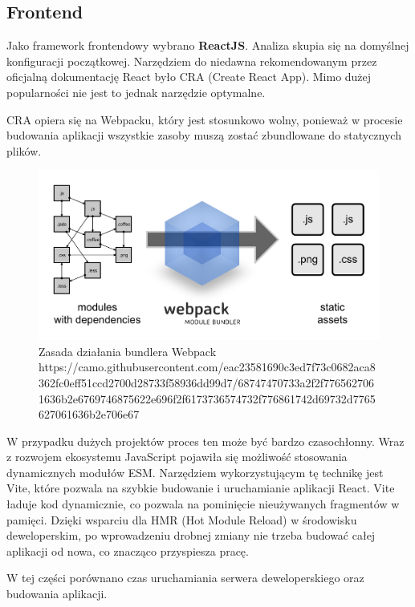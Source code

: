 \documentclass{article}
\begin{document}
\subsection{Frontend}

Jako framework frontendowy wybrano \textbf{ReactJS}. Analiza skupia się na domyślnej konfiguracji początkowej. Narzędziem do niedawna rekomendowanym przez oficjalną dokumentację React było CRA\cite{DevCra} (Create React App). Mimo dużej popularności nie jest to jednak narzędzie optymalne.

CRA opiera się na Webpacku, który jest stosunkowo wolny, ponieważ w procesie budowania aplikacji wszystkie zasoby muszą zostać zbundlowane do statycznych plików.

\begin{figure}[H]
    \centering
    \includegraphics[width=\textwidth]{webpack.png}
    \caption{Zasada działania bundlera Webpack https://camo.githubusercontent.com/eac23581690c3ed7f73c0682aca8362fc0eff51ccd2700d28733f58936dd99d7/68747470733a2f2f7765627061636b2e6769746875622e696f2f6173736574732f776861742d69732d7765627061636b2e706e67}
    \label{fig:ast}
\end{figure}

W przypadku dużych projektów proces ten może być bardzo czasochłonny. Wraz z rozwojem ekosystemu JavaScript pojawiła się możliwość stosowania dynamicznych modułów ESM. Narzędziem wykorzystującym tę technikę jest Vite, które pozwala na szybkie budowanie i uruchamianie aplikacji React\cite{ViteSite}. Vite ładuje kod dynamicznie, co pozwala na pominięcie nieużywanych fragmentów w pamięci. Dzięki wsparciu dla HMR (Hot Module Reload) w środowisku deweloperskim, po wprowadzeniu drobnej zmiany nie trzeba budować całej aplikacji od nowa, co znacząco przyspiesza pracę.

W tej części porównano czas uruchamiania serwera deweloperskiego oraz budowania aplikacji.
\end{document}
